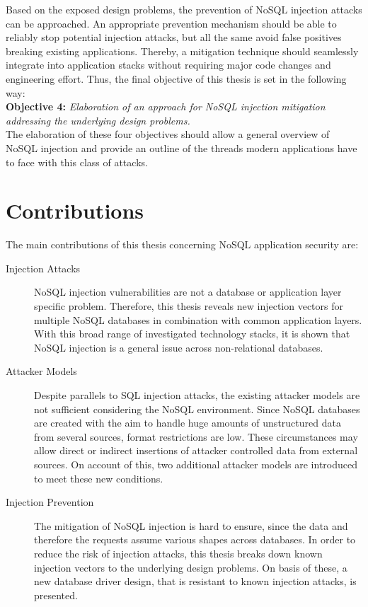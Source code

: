 Based on the exposed design problems, the prevention of NoSQL injection attacks can be approached. An appropriate prevention mechanism should be able to reliably stop potential injection attacks, but all the same avoid false positives breaking existing applications. Thereby, a mitigation technique should seamlessly integrate into application stacks without requiring major code changes and engineering effort. Thus, the final objective of this thesis is set in the following way:\\

\textbf{Objective 4:} \textit{Elaboration of an approach for NoSQL injection mitigation addressing the underlying design problems.} \\

The elaboration of these four objectives should allow a general overview of NoSQL injection and provide an outline of the threads modern applications have to face with this class of attacks. \\


\section{Contributions}

The main contributions of this thesis concerning NoSQL application security are:
\begin{description}
\item [Injection Attacks] NoSQL injection vulnerabilities are not a database or application layer specific problem. Therefore, this thesis reveals new injection vectors for multiple NoSQL databases in combination with common application layers. With this broad range of investigated technology stacks, it is shown that NoSQL injection is a general issue across non-relational databases.
\item [Attacker Models] Despite parallels to SQL injection attacks, the existing attacker models are not sufficient considering the NoSQL environment. Since NoSQL databases are created with the aim to handle huge amounts of unstructured data from several sources, format restrictions are low. These circumstances may allow direct or indirect insertions of attacker controlled data from external sources. On account of this, two additional attacker models are introduced to meet these new conditions.
\item [Injection Prevention] The mitigation of NoSQL injection is hard to ensure, since the data and therefore the requests assume various shapes across databases. In order to reduce the risk of injection attacks, this thesis breaks down known injection vectors to the underlying design problems. On basis of these, a new database driver design, that is resistant to known injection attacks, is presented.
\end{description}

